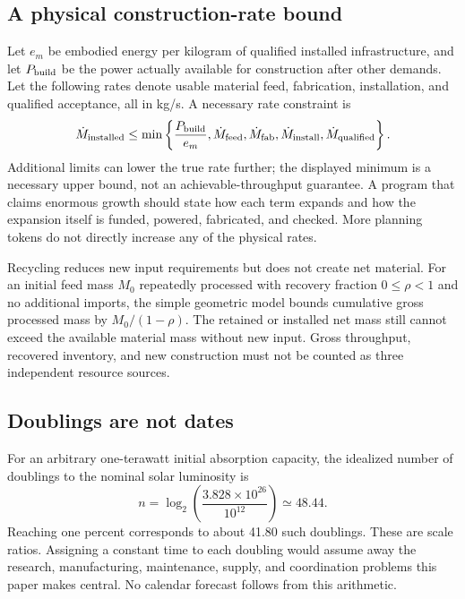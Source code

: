 \documentclass[11pt,letterpaper]{article}
\newcommand{\1}{\mathbf 1}
\theoremstyle{remark}\newtheorem{remark}{Remark}[section]
\begin{document}
\subsection{A physical construction-rate bound}
Let $e_m$ be embodied energy per kilogram of qualified installed infrastructure, and let $P_{\rm build}$ be the power actually available for construction after other demands. Let the following rates denote usable material feed, fabrication, installation, and qualified acceptance, all in kg/s. A necessary rate constraint is
\begin{equation}\label{eq:rate}
 \dot M_{\rm installed}\le
 \min\left\{\frac{P_{\rm build}}{e_m},\dot M_{\rm feed},\dot M_{\rm fab},
                    \dot M_{\rm install},\dot M_{\rm qualified}\right\}.
\end{equation}
Additional limits can lower the true rate further; the displayed minimum is a necessary upper bound, not an achievable-throughput guarantee. A program that claims enormous growth should state how each term expands and how the expansion itself is funded, powered, fabricated, and checked. More planning tokens do not directly increase any of the physical rates.

Recycling reduces new input requirements but does not create net material. For an initial feed mass $M_0$ repeatedly processed with recovery fraction $0\le\rho<1$ and no additional imports, the simple geometric model bounds cumulative gross processed mass by $M_0/(1-\rho)$. The retained or installed net mass still cannot exceed the available material mass without new input. Gross throughput, recovered inventory, and new construction must not be counted as three independent resource sources.

\subsection{Doublings are not dates}
For an arbitrary one-terawatt initial absorption capacity, the idealized number of doublings to the nominal solar luminosity is
\begin{equation}
 n=\log_2\!\left(\frac{3.828\times10^{26}}{10^{12}}\right)\simeq48.44.
\end{equation}
Reaching one percent corresponds to about 41.80 such doublings. These are scale ratios. Assigning a constant time to each doubling would assume away the research, manufacturing, maintenance, supply, and coordination problems this paper makes central. No calendar forecast follows from this arithmetic.
\end{document}
